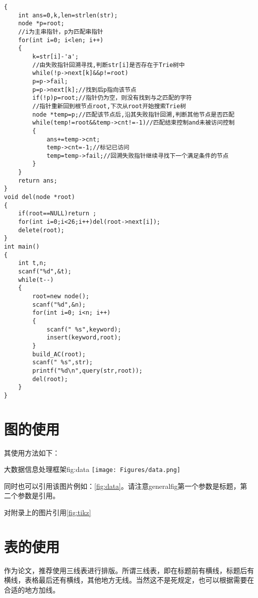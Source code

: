 \documentclass{CustGraduPaper}
\begin{document}
\begin{lstlisting}
{
	int ans=0,k,len=strlen(str);
	node *p=root;
	//i为主串指针，p为匹配串指针
	for(int i=0; i<len; i++)
	{
		k=str[i]-'a';
		//由失败指针回溯寻找,判断str[i]是否存在于Trie树中
		while(!p->next[k]&&p!=root)
		p=p->fail;
		p=p->next[k];//找到后p指向该节点
		if(!p)p=root;//指针仍为空，则没有找到与之匹配的字符
		//指针重新回到根节点root,下次从root开始搜索Trie树
		node *temp=p;//匹配该节点后,沿其失败指针回溯,判断其他节点是否匹配
		while(temp!=root&&temp->cnt!=-1)//匹配结束控制and未被访问控制
		{
			ans+=temp->cnt;
			temp->cnt=-1;//标记已访问
			temp=temp->fail;//回溯失败指针继续寻找下一个满足条件的节点
		}
	}
	return ans;
}
void del(node *root)
{
	if(root==NULL)return ;
	for(int i=0;i<26;i++)del(root->next[i]);
	delete(root);
}
int main()
{
	int t,n;
	scanf("%d",&t);
	while(t--)
	{
		root=new node();
		scanf("%d",&n);
		for(int i=0; i<n; i++)
		{
			scanf(" %s",keyword);
			insert(keyword,root);
		}
		build_AC(root);
		scanf(" %s",str);
		printf("%d\n",query(str,root));
		del(root);
	}
}

\end{lstlisting}

\section{图的使用}

其使用方法如下：

\begin{generalfig}[htb]{大数据信息处理框架}{fig:data}
	\texttt{[image: Figures/data.png]}
\end{generalfig}

同时也可以引用该图片例如：\autoref{fig:data}。请注意generalfig第一个参数是标题，第二个参数是引用。

对附录上的图片引用\autoref{fig:tikz}
\newpage

\section{表的使用}
作为论文，推荐使用三线表进行排版。所谓三线表，即在标题前有横线，标题后有横线，表格最后还有横线，其他地方无线。当然这不是死规定，也可以根据需要在合适的地方加线。
\end{document}
